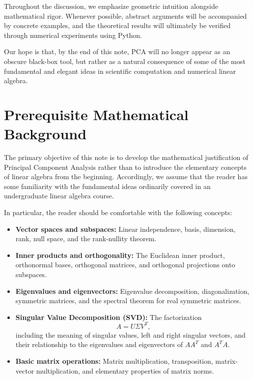 \documentclass[11pt]{article}
\begin{document}
Throughout the discussion, we emphasize
geometric intuition alongside mathematical
rigor. Whenever possible, abstract arguments
will be accompanied by concrete examples,
and the theoretical results will ultimately
be verified through numerical experiments
using Python.

Our hope is that, by the end of this note,
PCA will no longer appear as an obscure
black-box tool, but rather as a natural
consequence of some of the most fundamental
and elegant ideas in scientific computation and numerical linear algebra.



\section{Prerequisite Mathematical Background}

The primary objective of this note is to develop
the mathematical justification of Principal Component
Analysis rather than to introduce the elementary
concepts of linear algebra from the beginning.
Accordingly, we assume that the reader has some
familiarity with the fundamental ideas ordinarily
covered in an undergraduate linear algebra course.

In particular, the reader should be comfortable
with the following concepts:

\begin{itemize}[leftmargin=1.5cm]

    \item \textbf{Vector spaces and subspaces:}
    Linear independence, basis, dimension, rank,
    null space, and the rank-nullity theorem.

    \item \textbf{Inner products and orthogonality:}
    The Euclidean inner product, orthonormal bases,
    orthogonal matrices, and orthogonal projections
    onto subspaces.

    \item \textbf{Eigenvalues and eigenvectors:}
    Eigenvalue decomposition, diagonalization,
    symmetric matrices, and the spectral theorem
    for real symmetric matrices.

    \item \textbf{Singular Value Decomposition (SVD):}
    The factorization
    \[
        A = U\Sigma V^T,
    \]
    including the meaning of singular values,
    left and right singular vectors, and their
    relationship to the eigenvalues and
    eigenvectors of $AA^T$ and $A^TA$.

    \item \textbf{Basic matrix operations:}
    Matrix multiplication, transposition,
    matrix-vector multiplication, and elementary
    properties of matrix norms.

\end{itemize}
\end{document}
